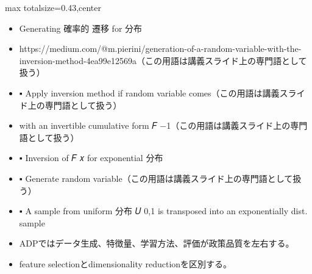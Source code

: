 \clearpage
{}
\begin{minipage}[t]{0.405\textwidth}
\begin{adjustbox}{max totalsize={\textwidth}{0.43\textheight},center}
\begin{minipage}{\textwidth}\scriptsize
{}\begin{itemize}
\item Generating 確率的 遷移 for 分布
\item https://medium.com/@m.pierini/generation-of-a-random-variable-with-the-inversion-method-4ea99e12569a（この用語は講義スライド上の専門語として扱う）
\item ▪ Apply inversion method if random variable comes（この用語は講義スライド上の専門語として扱う）
\item with an invertible cumulative form 𝐹 −1（この用語は講義スライド上の専門語として扱う）
\item ▪ Inversion of 𝐹 𝑥 for exponential 分布
\item ▪ Generate random variable（この用語は講義スライド上の専門語として扱う）
\item ▪ A sample from uniform 分布 𝑈 0,1 is transposed into an exponentially dist. sample
\end{itemize}\begin{itemize}
\item ADPではデータ生成、特徴量、学習方法、評価が政策品質を左右する。
\item feature selectionとdimensionality reductionを区別する。
\end{itemize}
\end{minipage}
\end{adjustbox}
\end{minipage}\hfill
